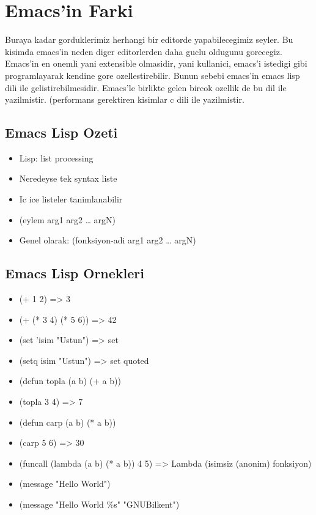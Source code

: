 \documentclass[11pt]{article}
\begin{document}
\section{Emacs'in Farki}
\label{sec-3}

Buraya kadar gorduklerimiz herhangi bir editorde yapabilecegimiz
seyler. Bu kisimda emacs'in neden diger editorlerden daha guclu
oldugunu gorecegiz. Emacs'in en onemli yani extensible olmasidir, yani
kullanici, emacs'i istedigi gibi programlayarak kendine gore
ozellestirebilir. Bunun sebebi emacs'in emacs lisp dili ile
gelistirebilmesidir. Emacs'le birlikte gelen bircok ozellik de bu dil
ile yazilmistir. (performans gerektiren kisimlar c dili ile
yazilmistir.

\subsection{Emacs Lisp Ozeti}
\label{sec-3-1}

\begin{itemize}
\item Lisp: list processing
\item Neredeyse tek syntax liste
\item Ic ice listeler tanimlanabilir
\item (eylem arg1 arg2 \ldots{} argN)
\item Genel olarak: (fonksiyon-adi arg1 arg2 \ldots{} argN)
\end{itemize}

\subsection{Emacs Lisp Ornekleri}
\label{sec-3-2}

\begin{itemize}
\item (+ 1 2) => 3
\item (+ (* 3 4) (* 5 6)) => 42
\item (set 'isim "Ustun") => set
\item (setq isim "Ustun") => set quoted
\item (defun topla (a b)  (+ a b))
\item (topla 3 4) => 7
\item (defun carp  (a b)  (* a b))
\item (carp 5 6) => 30
\item (funcall (lambda (a b) (* a b)) 4 5) => Lambda (isimsiz (anonim) fonksiyon)
\item (message "Hello World")
\item (message "Hello World \%s" "GNUBilkent")
\end{itemize}
\end{document}
